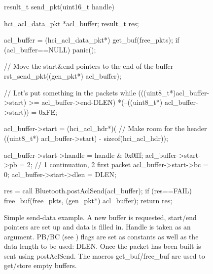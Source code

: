 \documentclass[a4paper,10pt]{article}
\begin{document}
\begin{figure}[tbp]
\begin{scriptsize}
\begin{center}
\begin{boxedverbatim}
result_t send_pkt(uint16_t handle) {
     hci_acl_data_pkt *acl_buffer;
     result_t res;

     acl_buffer = (hci_acl_data_pkt*) get_buf(free_pkts);
     if (acl_buffer==NULL) panic();

     // Move the start&end pointers to the end of the buffer
     rst_send_pkt((gen_pkt*) acl_buffer);

     // Let's put something in the packets
     while (((uint8_t*)acl_buffer->start) >= acl_buffer->end-DLEN)
          *(--((uint8_t*) acl_buffer->start)) = 0xFE;

     acl_buffer->start = (hci_acl_hdr*)( // Make room for the header
          ((uint8_t*) acl_buffer->start) - sizeof(hci_acl_hdr));

     acl_buffer->start->handle = handle & 0x0fff;
     acl_buffer->start->pb = 2; // 1 continuation, 2 first packet
     acl_buffer->start->bc = 0;
     acl_buffer->start->dlen = DLEN;

     res = call Bluetooth.postAclSend(acl_buffer);
     if (res==FAIL) free_buf(free_pkts, (gen_pkt*) acl_buffer);
     return res;
}
\end{boxedverbatim}
\end{center}
\end{scriptsize}
  \caption{Simple send-data example. A new buffer is requested,
    start/end pointers are set up and data is filled in. Handle is
    taken as an argument. PB/BC (see \cite{BT02}) flags are set as
    constants as well as the data length to be used: DLEN. Once the
    packet has been built is sent using postAclSend. The macros
    get\_buf/free\_buf are used to get/store empty buffers.}
  \label{fig:sendEx}
\end{figure}

\end{document}
